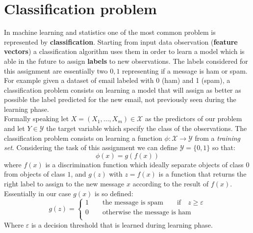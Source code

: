 \documentclass[11pt,a4paper]{article}
\begin{document}
\section{Classification problem}
In machine learning and statistics one of the most common problem is represented by \textbf{classification}. Starting from input data observation (\textbf{feature vectors}) a classification algorithm uses them in order to learn a model which is able in the future to assign \textbf{labels} to new observations. The labels considered for this assignment are essentially two $0,1$ representing if a message is ham or spam. For example given a dataset of email labeled with 0 (ham) and 1 (spam), a classification problem consists on learning a model that will assign as better as possible the label predicted for the new email, not previously seen during the learning phase. \\
Formally speaking let $X = (X_1, ..., X_m) \in \mathcal{X}$ as the predictors of our problem and let $Y \in \mathcal{Y} $ the target variable which specify the class of the observations. The classification problem consists on learning a function $\phi: \mathcal{X} \rightarrow \mathcal{Y}$ from a \textit{training set}.
Considering the task of this assignment we can define $\mathcal{Y} = \{0,1\}$ so that:
$$\phi(x) = g(f(x))$$
where $f(x)$ is a discrimination function which ideally separate objects of class $0$ from objects of class $1$, and $g(z)$ with $z = f(x)$ is a function that returns the right label to assign to the new message $x$ according to the result of $f(x)$. Essentially in our case $g(x)$ is so defined:  
$$
g(z)=
\begin{cases}
1\qquad \text{the message is spam} \qquad \text{if} \quad z \geq \varepsilon\\
0\qquad \text{otherwise the message is ham}\\
\end{cases}
$$
Where $\varepsilon$ is a decision threshold that is learned during learning phase.
\end{document}
